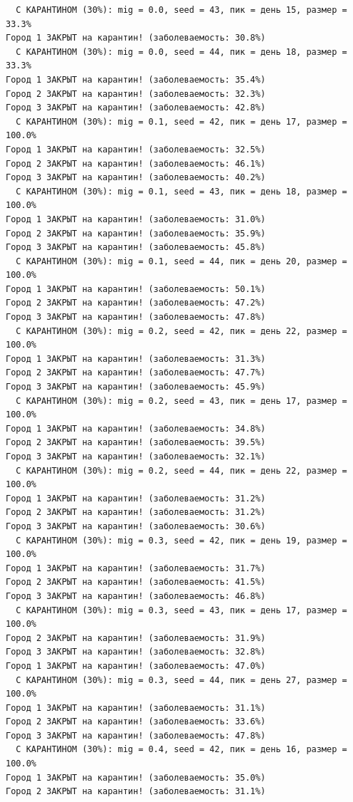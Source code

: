 \documentclass[
  12pt,
  a4paper,
  DIV=11,
  numbers=noendperiod]{scrreprt}
\begin{document}
\begin{verbatim}
  С КАРАНТИНОМ (30%): mig = 0.0, seed = 43, пик = день 15, размер = 33.3%
Город 1 ЗАКРЫТ на карантин! (заболеваемость: 30.8%)
  С КАРАНТИНОМ (30%): mig = 0.0, seed = 44, пик = день 18, размер = 33.3%
Город 1 ЗАКРЫТ на карантин! (заболеваемость: 35.4%)
Город 2 ЗАКРЫТ на карантин! (заболеваемость: 32.3%)
Город 3 ЗАКРЫТ на карантин! (заболеваемость: 42.8%)
  С КАРАНТИНОМ (30%): mig = 0.1, seed = 42, пик = день 17, размер = 100.0%
Город 1 ЗАКРЫТ на карантин! (заболеваемость: 32.5%)
Город 2 ЗАКРЫТ на карантин! (заболеваемость: 46.1%)
Город 3 ЗАКРЫТ на карантин! (заболеваемость: 40.2%)
  С КАРАНТИНОМ (30%): mig = 0.1, seed = 43, пик = день 18, размер = 100.0%
Город 1 ЗАКРЫТ на карантин! (заболеваемость: 31.0%)
Город 2 ЗАКРЫТ на карантин! (заболеваемость: 35.9%)
Город 3 ЗАКРЫТ на карантин! (заболеваемость: 45.8%)
  С КАРАНТИНОМ (30%): mig = 0.1, seed = 44, пик = день 20, размер = 100.0%
Город 1 ЗАКРЫТ на карантин! (заболеваемость: 50.1%)
Город 2 ЗАКРЫТ на карантин! (заболеваемость: 47.2%)
Город 3 ЗАКРЫТ на карантин! (заболеваемость: 47.8%)
  С КАРАНТИНОМ (30%): mig = 0.2, seed = 42, пик = день 22, размер = 100.0%
Город 1 ЗАКРЫТ на карантин! (заболеваемость: 31.3%)
Город 2 ЗАКРЫТ на карантин! (заболеваемость: 47.7%)
Город 3 ЗАКРЫТ на карантин! (заболеваемость: 45.9%)
  С КАРАНТИНОМ (30%): mig = 0.2, seed = 43, пик = день 17, размер = 100.0%
Город 1 ЗАКРЫТ на карантин! (заболеваемость: 34.8%)
Город 2 ЗАКРЫТ на карантин! (заболеваемость: 39.5%)
Город 3 ЗАКРЫТ на карантин! (заболеваемость: 32.1%)
  С КАРАНТИНОМ (30%): mig = 0.2, seed = 44, пик = день 22, размер = 100.0%
Город 1 ЗАКРЫТ на карантин! (заболеваемость: 31.2%)
Город 2 ЗАКРЫТ на карантин! (заболеваемость: 31.2%)
Город 3 ЗАКРЫТ на карантин! (заболеваемость: 30.6%)
  С КАРАНТИНОМ (30%): mig = 0.3, seed = 42, пик = день 19, размер = 100.0%
Город 1 ЗАКРЫТ на карантин! (заболеваемость: 31.7%)
Город 2 ЗАКРЫТ на карантин! (заболеваемость: 41.5%)
Город 3 ЗАКРЫТ на карантин! (заболеваемость: 46.8%)
  С КАРАНТИНОМ (30%): mig = 0.3, seed = 43, пик = день 17, размер = 100.0%
Город 2 ЗАКРЫТ на карантин! (заболеваемость: 31.9%)
Город 3 ЗАКРЫТ на карантин! (заболеваемость: 32.8%)
Город 1 ЗАКРЫТ на карантин! (заболеваемость: 47.0%)
  С КАРАНТИНОМ (30%): mig = 0.3, seed = 44, пик = день 27, размер = 100.0%
Город 1 ЗАКРЫТ на карантин! (заболеваемость: 31.1%)
Город 2 ЗАКРЫТ на карантин! (заболеваемость: 33.6%)
Город 3 ЗАКРЫТ на карантин! (заболеваемость: 47.8%)
  С КАРАНТИНОМ (30%): mig = 0.4, seed = 42, пик = день 16, размер = 100.0%
Город 1 ЗАКРЫТ на карантин! (заболеваемость: 35.0%)
Город 2 ЗАКРЫТ на карантин! (заболеваемость: 31.1%)

\end{verbatim}
\end{document}
